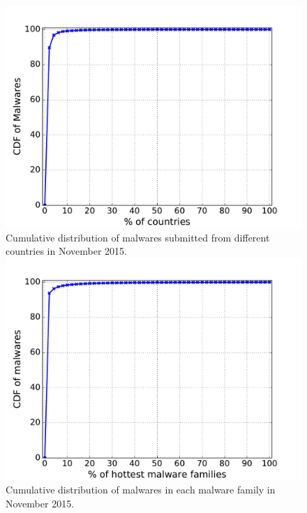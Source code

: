 \begin{figure}[!htb]
  \includegraphics[width=\linewidth]{figure/country}
{Cumulative distribution of malwares submitted from different countries in November 2015.}
\endminipage\hfill
{}
  \includegraphics[width=\linewidth]{figure/cum}
{
Cumulative distribution of malwares in each malware family in November 2015.
}
\endminipage\hfill
{}%

\end{figure}

